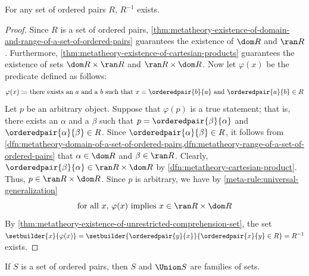 \begin{thm}
     \label{thm:metatheory-existence-of-inverse-of-a-set-of-ordered-pairs}
    For any set of ordered pairs \( R \), \( R^{-1} \) exists.
\end{thm}

\begin{proof}
    Since \( R \) is a set of ordered pairs,
    \cref{thm:metatheory-existence-of-domain-and-range-of-a-set-of-ordered-pairs} guarantees the existence of \( \dom R \) and \( \ran R \).
    Furthermore, \cref{thm:metatheory-existence-of-cartesian-products} guarantees the existence of sets \( \dom R \times \ran R \) and \( \ran R \times \dom R \).
    Now let \( \varphi(x) \) be the predicate defined as follows:
    \begin{equation*}
        \varphi(x) \coloneq \text{there exists an \( a \) and a \( b \) such that \( x = \orderedpair{b}{a} \) and \( \orderedpair{a}{b} \in R \)}
    \end{equation*}
    Let \( p \) be an arbitrary object.
    Suppose that \( \varphi(p) \) is a true statement;
    that is, there exists an \( \alpha \) and a \( \beta \) such that \( p = \orderedpair{\beta}{\alpha} \) and \( \orderedpair{\alpha}{\beta} \in R \).
    Since \( \orderedpair{\alpha}{\beta} \in R \), it follows from \cref{dfn:metatheory-domain-of-a-set-of-ordered-pairs,dfn:metatheory-range-of-a-set-of-ordered-pairs} that
    \( \alpha \in \dom R \) and \( \beta \in \ran R \).
    Clearly, \( \orderedpair{\beta}{\alpha} \in \ran R \times \dom R \) by \cref{dfn:metatheory-cartesian-product}.
    Thus, \( p \in \ran R \times \dom R \).
    Since \( p \) is arbitrary, we have by \cref{meta-rule:universal-generalization}
    \begin{equation*}
        \text{for all \( x \), \( \varphi(x) \) implies \( x \in \ran R \times \dom R \)}
    \end{equation*}
    By \cref{thm:metatheory-existence-of-unrestricted-comprehension-set},
    the set \( \setbuilder{x}{\varphi(x)} = \setbuilder{\orderedpair{y}{x}}{\orderedpair{x}{y} \in R} = R^{-1} \) exists.
\end{proof}

\begin{thm}
     \label{thm:metatheory-a-set-of-ordered-pairs-and-its-union-are-families-of-sets}
    If \( S \) is a set of ordered pairs, then \( S \) and \( \Union S \) are families of sets.
\end{thm}

